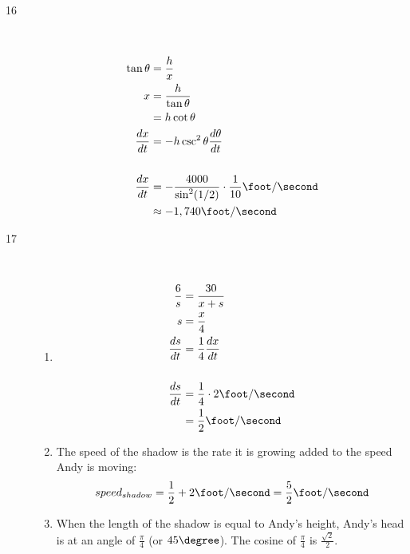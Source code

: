 \documentclass[fleqn]{exam}
\begin{document}
\begin{description}
\item[16]
\

\begin{align*}
  \tan \theta &= \frac{h}{x} \\
  x &= \frac{h}{\tan \theta} \\
    &= h \cot \theta \\
  \frac{dx}{dt} &= -h \csc^2 \theta \frac{d \theta}{dt} \\
  \\
  \frac{dx}{dt} &= - \frac{4000}{\sin^2 (1/2) } \cdot \frac{1}{10} \foot / \second \\
  &\approx -1,740 \foot / \second \\
\end{align*}

\pagebreak

\item[17]
\

\begin{enumerate}[a]

\item
\begin{align*}
  \frac{6}{s} &= \frac{30}{x + s} \\
  s &= \frac{x}{4} \\
  \frac{ds}{dt} &= \frac{1}{4} \frac{dx}{dt} \\
  \\
  \frac{ds}{dt} &= \frac{1}{4} \cdot 2 \foot / \second \\
                &= \frac{1}{2} \foot / \second  \\
\end{align*}

\item
The speed of the shadow is the rate it is growing added to the speed Andy is moving:
\[
  speed_{shadow} = \frac{1}{2} + 2 \foot / \second = \frac{5}{2} \foot / \second 
\]

\item
When the length of the shadow is equal to Andy's height, Andy's head is at an angle of $\frac{\pi}{4}$ (or $45
\degree$).  The cosine of $\frac{\pi}{4}$ is $\frac{\sqrt{2}}{2}$.


\end{enumerate}
\end{description}
\end{document}
